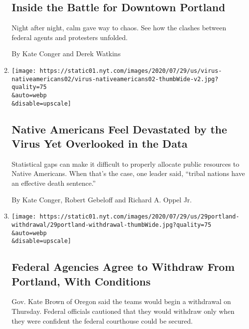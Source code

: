 \begin{enumerate}
  \hypertarget{inside-the-battle-for-downtown-portland}{%
  \subsection{Inside the Battle for Downtown
  Portland}\label{inside-the-battle-for-downtown-portland}}

  Night after night, calm gave way to chaos. See how the clashes between
  federal agents and protesters unfolded.

  By Kate Conger and Derek Watkins
\item
  \href{/2020/07/30/us/native-americans-coronavirus-data.html}{}

  \texttt{[image: https://static01.nyt.com/images/2020/07/29/us/virus-nativeamericans02/virus-nativeamericans02-thumbWide-v2.jpg?quality=75\\\&auto=webp\\\&disable=upscale]}

  \hypertarget{native-americans-feel-devastated-by-the-virus-yet-overlooked-in-the-data}{%
  \subsection{Native Americans Feel Devastated by the Virus Yet
  Overlooked in the
  Data}\label{native-americans-feel-devastated-by-the-virus-yet-overlooked-in-the-data}}

  Statistical gaps can make it difficult to properly allocate public
  resources to Native Americans. When that's the case, one leader said,
  ``tribal nations have an effective death sentence.''

  By Kate Conger, Robert Gebeloff and Richard A. Oppel Jr.
\item
  \href{/2020/07/29/us/protests-portland-federal-withdrawal.html}{}

  \texttt{[image: https://static01.nyt.com/images/2020/07/29/us/29portland-withdrawal/29portland-withdrawal-thumbWide.jpg?quality=75\\\&auto=webp\\\&disable=upscale]}

  \hypertarget{federal-agencies-agree-to-withdraw-from-portland-with-conditions}{%
  \subsection{Federal Agencies Agree to Withdraw From Portland, With
  Conditions}\label{federal-agencies-agree-to-withdraw-from-portland-with-conditions}}

  Gov. Kate Brown of Oregon said the teams would begin a withdrawal on
  Thursday. Federal officials cautioned that they would withdraw only
  when they were confident the federal courthouse could be secured.


\end{enumerate}

